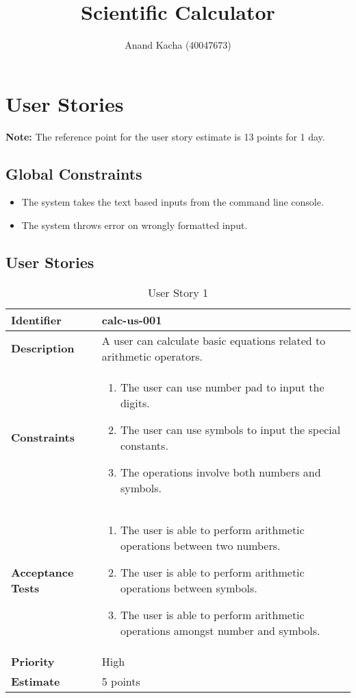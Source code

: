\documentclass{article}
\title{Scientific Calculator}
\author{Anand Kacha (40047673)}
\begin{document}
\tableofcontents
\listoftables

\clearpage

\section{User Stories}
\begin{flushleft}
\textbf{Note:} The reference point for the user story estimate is 13 points for 1 day.
\end{flushleft}

\subsection{Global Constraints}
\begin{itemize}
    \item The system takes the text based inputs from the command line console.
    \item The system throws error on wrongly formatted input.
\end{itemize}

\subsection{User Stories}
\begin{table}[h]
\centering
\begin{tabular}{|p{2.2cm}|p{12cm}|}
\hline
\textbf{Identifier} & {calc-us-001} \\
\hline
\textbf{Description} & {A user can calculate basic equations related to arithmetic operators.}\\
\hline
\textbf{Constraints} & 
\begin{enumerate}
    \item The user can use number pad to input the digits.
    \item The user can use symbols to input the special constants.
    \item The operations involve both numbers and symbols.
\end{enumerate}\\
\hline
\textbf{Acceptance Tests} & 
\begin{enumerate}
    \item The user is able to perform arithmetic operations between two numbers.
    \item The user is able to perform arithmetic operations between symbols.
    \item The user is able to perform arithmetic operations amongst number and symbols.
\end{enumerate}\\
\hline
\textbf{Priority} & {High}\\
\hline
\textbf{Estimate} & {5 points}\\
\hline
\end{tabular}
\caption{User Story 1}
\end{table}
\end{document}
